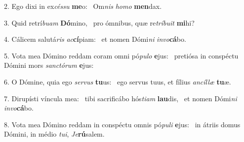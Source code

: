 2. Ego dixi in ex\textit{cés}\textit{su} \textbf{me}o: \ast\  Om\textit{nis} \textit{ho}\textit{mo} \textbf{men}dax.\

3. Quid retrí\textit{bu}\textit{am} \textbf{Dó}mino, \ast\  pro ómnibus, quæ re\textit{trí}\textit{bu}\textit{it} \textbf{mi}hi?\

4. Cálicem salutá\textit{ris} \textit{ac}\textbf{cí}piam: \ast\  et nomen Dómi\textit{ni} \textit{in}\textit{vo}\textbf{cá}bo.\

5. Vota mea Dómino reddam coram omni pó\textit{pu}\textit{lo} \textbf{e}jus: \ast\  pretiósa in conspéctu Dómini mors \textit{sanc}\textit{tó}\textit{rum} \textbf{e}jus:\

6. O Dómine, quia ego \textit{ser}\textit{vus} \textbf{tu}us: \ast\  ego servus tuus, et fílius \textit{an}\textit{cíl}\textit{læ} \textbf{tu}æ.\

7. Dirupísti víncula mea: \dag\  tibi sacrificábo hós\textit{ti}\textit{am} \textbf{lau}dis, \ast\  et nomen Dómi\textit{ni} \textit{in}\textit{vo}\textbf{cá}bo.\

8. Vota mea Dómino reddam in conspéctu omnis pó\textit{pu}\textit{li} \textbf{e}jus: \ast\  in átriis domus Dómini, in médio \textit{tu}\textit{i}, \textit{Je}\textbf{rú}salem.\


